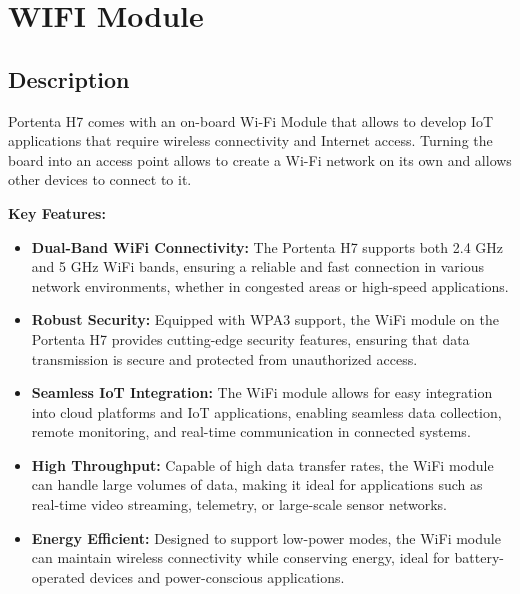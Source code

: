 \chapter{WIFI Module}

\section{Description}

Portenta H7 comes with an on-board Wi-Fi  Module that allows to develop IoT applications that require wireless connectivity and Internet access. Turning the board into an access point allows to create a Wi-Fi network on its own and allows other devices to connect to it. \cite{portentaWifiAccessPoint:2024}
\newline

\textbf{Key Features:}
\begin{itemize}
	
	\item \textbf{Dual-Band WiFi Connectivity:} The Portenta H7 supports both 2.4 GHz and 5 GHz WiFi bands, ensuring a reliable and fast connection in various network environments, whether in congested areas or high-speed applications. 
	
	\item \textbf{Robust Security:} Equipped with WPA3 support, the WiFi module on the Portenta H7 provides cutting-edge security features, ensuring that data transmission is secure and protected from unauthorized access. 
	
	\item \textbf{Seamless IoT Integration:} The WiFi module allows for easy integration into cloud platforms and IoT applications, enabling seamless data collection, remote monitoring, and real-time communication in connected systems. 
	
	\item \textbf{High Throughput:} Capable of high data transfer rates, the WiFi module can handle large volumes of data, making it ideal for applications such as real-time video streaming, telemetry, or large-scale sensor networks. 
	
	\item \textbf{Energy Efficient:} Designed to support low-power modes, the WiFi module can maintain wireless connectivity while conserving energy, ideal for battery-operated devices and power-conscious applications. \cite{portentaWifiAccessPoint:2024}
	
\end{itemize}

